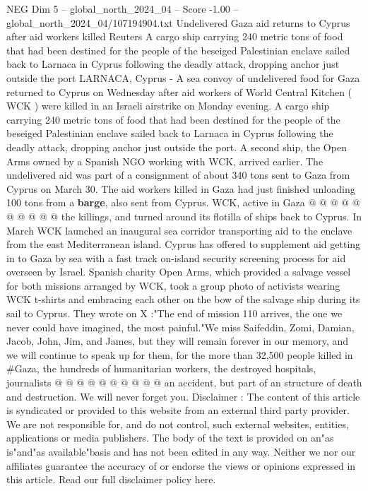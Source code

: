 \begin{textsample}{NEG Dim 5 – global\_north\_2024\_04 – Score -1.00 – global\_north\_2024\_04/107194904.txt}  \label{ex:f5_neg_161}
Undelivered Gaza aid returns to Cyprus after aid workers killed Reuters A cargo ship carrying 240 metric tons of food that had been destined for the people of the beseiged Palestinian enclave sailed back to Larnaca in Cyprus following the deadly attack, dropping anchor just outside the port LARNACA, Cyprus - A sea convoy of undelivered food for Gaza returned to Cyprus on Wednesday after aid workers of World Central Kitchen ( WCK ) were killed in an Israeli airstrike on Monday evening.
A cargo ship carrying 240 metric tons of food that had been destined for the people of the beseiged Palestinian enclave sailed back to Larnaca in Cyprus following the deadly attack, dropping anchor just outside the port.
A second ship, the Open Arms owned by a Spanish NGO working with WCK, arrived earlier.
The undelivered aid was part of a consignment of about 340 tons sent to Gaza from Cyprus on March 30.
The aid workers killed in Gaza had just finished unloading 100 tons from a \textbf{barge}, also sent from Cyprus.
WCK, active in Gaza @ @ @ @ @ @ @ @ @ @ the killings, and turned around its flotilla of ships back to Cyprus.
In March WCK launched an inaugural sea corridor transporting aid to the enclave from the east Mediterranean island.
Cyprus has offered to supplement aid getting in to Gaza by sea with a fast track on-island security screening process for aid overseen by Israel.
Spanish charity Open Arms, which provided a salvage vessel for both missions arranged by WCK, took a group photo of activists wearing WCK t-shirts and embracing each other on the bow of the salvage ship during its sail to Cyprus.
They wrote on X :"The end of mission 110 arrives, the one we never could have imagined, the most painful."We miss Saifeddin, Zomi, Damian, Jacob, John, Jim, and James, but they will remain forever in our memory, and we will continue to speak up for them, for the more than 32,500 people killed in \#Gaza, the hundreds of humanitarian workers, the destroyed hospitals, journalists @ @ @ @ @ @ @ @ @ @ an accident, but part of an structure of death and destruction.
We will never forget you.
Disclaimer : The content of this article is syndicated or provided to this website from an external third party provider.
We are not responsible for, and do not control, such external websites, entities, applications or media publishers.
The body of the text is provided on an"as is"and"as available"basis and has not been edited in any way.
Neither we nor our affiliates guarantee the accuracy of or endorse the views or opinions expressed in this article.
Read our full disclaimer policy here.

\end{textsample}
